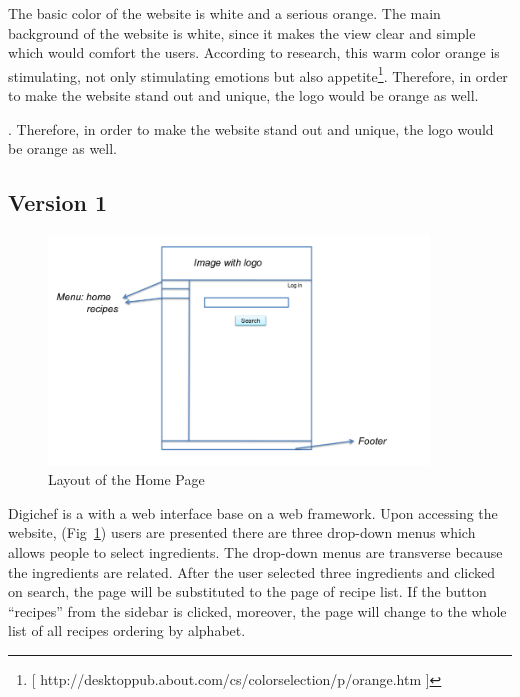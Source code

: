 The basic color of the website is white and a serious orange. The main background of the website is white, since it makes the view clear and simple which would comfort the users. According to research, this warm color orange is stimulating, not only stimulating emotions but also appetite\footnote{[ http://desktoppub.about.com/cs/colorselection/p/orange.htm ]}. Therefore, in order to make the website stand out and unique, the logo would be orange as well.

. Therefore, in order to make the website stand out and unique, the logo would be orange as well.

\subsection{Version 1}

\begin{figure}
\includegraphics[width=0.9\textwidth]{home_page}
\caption{Layout of the Home Page}
\label{fig:home_page}
\end{figure}

Digichef is a with a web interface base on a web framework. Upon accessing the website, (Fig~\ref{fig:home_page}) users are presented there are three drop-down menus which allows people to select ingredients. The drop-down menus are transverse because the ingredients are related. After the user selected three ingredients and clicked on search, the page will be substituted to the page of recipe list. If the button “recipes” from the sidebar is clicked, moreover, the page will change to the whole list of all recipes ordering by alphabet.

